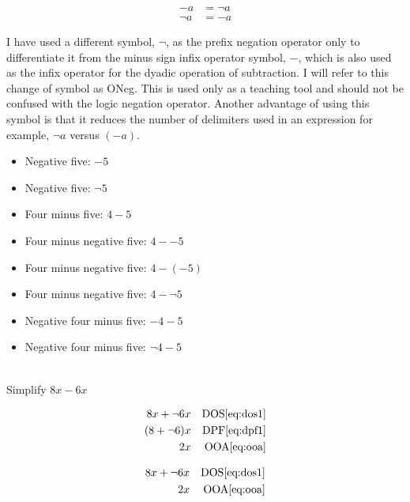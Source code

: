 \begin{notation}

\begin{subequations}
\begin{align}
-a &= \neg a \label{eq:oneg1} \\
\neg a &= -a \label{eq:oneg2} 
\end{align}
\end{subequations}

I have used a different symbol, $\neg$, as the prefix negation operator only to differentiate it from the minus sign infix operator symbol, $-$, which is also used as the infix operator for the dyadic operation of subtraction.  I will refer to this change of symbol as ONeg.  This is used only as a teaching tool and should not be confused with the logic negation operator.  Another advantage of using this symbol is that it reduces the number of delimiters used in an expression for example, $\neg a$ versus $(-a)$.

\begin{itemize}
	\item Negative five: $-5$
	\item Negative five: $\neg 5$
	\item Four minus five: $4-5$
	\item Four minus negative five: $4--5$
	\item Four minus negative five: $4-(-5)$
	\item Four minus negative five: $4-\neg 5$
	\item Negative four minus five: $-4-5$
	\item Negative four minus five: $\neg 4-5$
\end{itemize}
	
\end{notation}

\begin{example}[id:20141121-190857] \label{20141121-190857} \hfill \\

Simplify $8x-6x$

\soln

\solnsteps
\begin{align*}
8x + \neg 6x && \text{DOS} \eqref{eq:dos1} \\
(8+\neg 6)x && \text{DPF} \eqref{eq:dpf1} \\
2x && \text{OOA} \eqref{eq:ooa} 
\end{align*}

\soln

\lesssteps
\begin{align*}
8x + \neg 6x && \text{DOS} \eqref{eq:dos1} \\
2x && \text{OOA} \eqref{eq:ooa} 
\end{align*}


\end{example}


